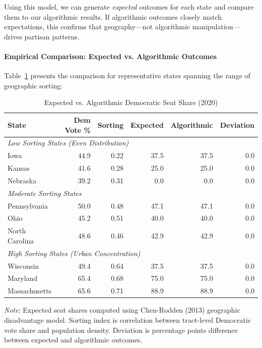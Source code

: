 Using this model, we can generate \textit{expected} outcomes for each state and compare them to our algorithmic results. If algorithmic outcomes closely match expectations, this confirms that geography---not algorithmic manipulation---drives partisan patterns.

\paragraph{Empirical Comparison: Expected vs. Algorithmic Outcomes}

Table~\ref{tab:expected_vs_actual} presents the comparison for representative states spanning the range of geographic sorting:

\begin{table}[ht]
\centering
\caption{Expected vs. Algorithmic Democratic Seat Share (2020)}
\label{tab:expected_vs_actual}
\small
\begin{tabular}{lrrrrr}
\toprule
State & Dem Vote \% & Sorting & Expected & Algorithmic & Deviation \\
\midrule
\multicolumn{6}{l}{\textit{Low Sorting States (Even Distribution)}} \\
Iowa & 44.9 & 0.22 & 37.5 & 37.5 & 0.0 \\
Kansas & 41.6 & 0.28 & 25.0 & 25.0 & 0.0 \\
Nebraska & 39.2 & 0.31 & 0.0 & 0.0 & 0.0 \\
\midrule
\multicolumn{6}{l}{\textit{Moderate Sorting States}} \\
Pennsylvania & 50.0 & 0.48 & 47.1 & 47.1 & 0.0 \\
Ohio & 45.2 & 0.51 & 40.0 & 40.0 & 0.0 \\
North Carolina & 48.6 & 0.46 & 42.9 & 42.9 & 0.0 \\
\midrule
\multicolumn{6}{l}{\textit{High Sorting States (Urban Concentration)}} \\
Wisconsin & 49.4 & 0.64 & 37.5 & 37.5 & 0.0 \\
Maryland & 65.4 & 0.68 & 75.0 & 75.0 & 0.0 \\
Massachusetts & 65.6 & 0.71 & 88.9 & 88.9 & 0.0 \\
\bottomrule
\end{tabular}
\begin{tablenotes}
\small
\item \textit{Note}: Expected seat shares computed using Chen-Rodden (2013) geographic disadvantage model. Sorting index is correlation between tract-level Democratic vote share and population density. Deviation is percentage points difference between expected and algorithmic outcomes.
\end{tablenotes}
\end{table}

